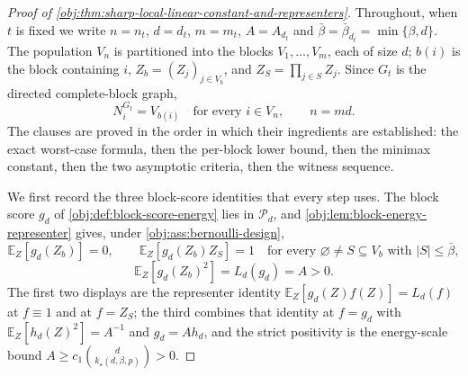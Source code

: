 \begin{proof}[Proof of \cref{obj:thm:sharp-local-linear-constant-and-representers}]
Throughout, when \(t\) is fixed we write \(n=n_t\), \(d=d_t\), \(m=m_t\), \(A=A_{d_t}\) and \(\bar\beta=\bar\beta_{d_t}=\min\{\beta,d\}\).  The population \(V_{n}\) is partitioned into the blocks \(V_1,\ldots,V_m\), each of size \(d\); \(b(i)\) is the block containing \(i\), \(Z_b=(Z_j)_{j\in V_b}\), and \(Z_S=\prod_{j\in S}Z_j\).  Since \(G_t\) is the directed complete-block graph,
\[
N_i^{G_t}=V_{b(i)}\quad\text{for every }i\in V_{n},
\qquad
n=md .
\]
The clauses are proved in the order in which their ingredients are established: the exact worst-case formula, then the per-block lower bound, then the minimax constant, then the two asymptotic criteria, then the witness sequence.

We first record the three block-score identities that every step uses.  The block score \(g_{d}\) of \cref{obj:def:block-score-energy} lies in \(\mathcal P_{d}\), and \cref{obj:lem:block-energy-representer} gives, under \cref{obj:ass:bernoulli-design},
\[
\mathbb E_Z[g_{d}(Z_b)]=0,
\qquad
\mathbb E_Z[g_{d}(Z_b)Z_S]=1
\quad\text{for every }\varnothing\ne S\subseteq V_b\text{ with }|S|\le\bar\beta ,
\]
\[
\mathbb E_Z[g_{d}(Z_b)^2]=L_{d}(g_{d})=A>0 .
\]
The first two displays are the representer identity \(\mathbb E_Z[g_{d}(Z)f(Z)]=L_{d}(f)\) at \(f\equiv1\) and at \(f=Z_S\); the third combines that identity at \(f=g_{d}\) with \(\mathbb E_Z[h_{d}(Z)^2]=A^{-1}\) and \(g_{d}=Ah_{d}\), and the strict positivity is the energy-scale bound \(A\ge c_1\binom{d}{k_\star(d,\beta,p)}>0\). %


\end{proof}
